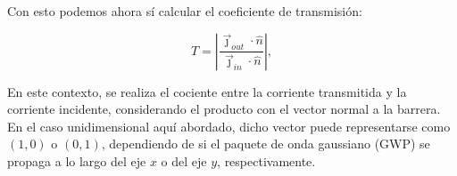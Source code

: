 Con esto podemos ahora sí calcular el coeficiente de transmisión:

\begin{equation}
    \label{eq:transmissionCoef}
    T = \left| \frac{\vec{\jmath}_{out}\cdot\hat{n}}{\vec{\jmath}_{in}\cdot\hat{n}} \right|,
\end{equation}

\noindent En este contexto, se realiza el cociente entre la corriente transmitida y la corriente incidente, considerando el producto con el vector normal a la barrera.
En el caso unidimensional aquí abordado, dicho vector puede representarse como $(1,0)$ o $(0,1)$, dependiendo de si el paquete de onda gaussiano (GWP) se propaga a lo largo del eje $x$ o del eje $y$, respectivamente.
